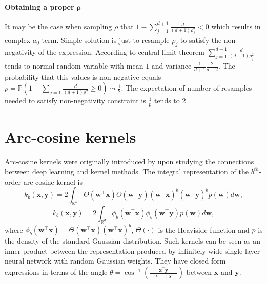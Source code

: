 \paragraph*{Obtaining a proper \texorpdfstring{$\boldsymbol{\rho}$}.}
It may be the case when sampling $\rho$ that $1 - \sum_{j = 1}^{d + 1}\frac{d}{(d + 1)\rho_j^2} < 0$ which results in complex $a_0$ term. Simple solution is just to resample $\rho_j$ to satisfy the non-negativity of the expression.
According to central limit theorem $\sum_{j = 1}^{d + 1} \frac{d}{(d + 1)\rho_j^2}$ tends to normal random variable with mean $1$ and variance $\frac{1}{d + 1}\frac{2}{d - 2}$.
The probability that this values is non-negative equals ${p = \mathbb{P}(1 - \sum_{j = 1}\frac{d}{(d + 1)\rho^2} \ge 0) \leadsto \frac12}$.
The expectation of number of resamples needed to satisfy non-negativity constraint is $\frac{1}{p}$ tends to 2.


\section{Arc-cosine kernels}
\label{sub:arccos}
Arc-cosine kernels were originally introduced by \citep{cho2009kernel} upon studying the connections between deep learning and kernel methods. The integral representation of the $b^{th}$-order arc-cosine kernel is
\begin{equation*}
k_b(\mathbf{x}, \mathbf{y}) = 2 \int_{\mathbb{R}^n} \Theta(\mathbf{w}^{\boldsymbol{\top}}\mathbf{x})
                                                  \Theta(\mathbf{w}^{\boldsymbol{\top}}\mathbf{y})
                                                  (\mathbf{w}^{\boldsymbol{\top}}\mathbf{x})^b
                                                  (\mathbf{w}^{\boldsymbol{\top}}\mathbf{y})^b
                                                  p(\mathbf{w}) d\mathbf{w},
\end{equation*}
\begin{equation*}
k_b(\mathbf{x}, \mathbf{y}) = 2 \int_{\mathbb{R}^d} \phi_b(\mathbf{w}^{\boldsymbol{\top}}\mathbf{x})
\phi_b(\mathbf{w}^{\boldsymbol{\top}}\mathbf{y}) p(\mathbf{w}) d\mathbf{w},
\end{equation*}
where $\phi_b(\mathbf{w}^{\boldsymbol{\top}}\mathbf{x}) = \Theta(\mathbf{w}^{\boldsymbol{\top}}\mathbf{x}) (\mathbf{w}^{\boldsymbol{\top}}\mathbf{x})^b$, $\Theta(\cdot)$ is the Heaviside function
and $p$ is the density of the standard Gaussian distribution.
Such kernels can be seen as an inner product between the representation produced by infinitely wide single layer neural network with random Gaussian weights. They have closed form expressions in terms of the angle $\theta = \cos^{-1} \left( \frac{\mathbf{x}^{\boldsymbol{\top}}\mathbf{y}}{\|\mathbf{x}\|\|\mathbf{y}\|} \right)$ between %
$\mathbf{x}$ and $\mathbf{y}$.


